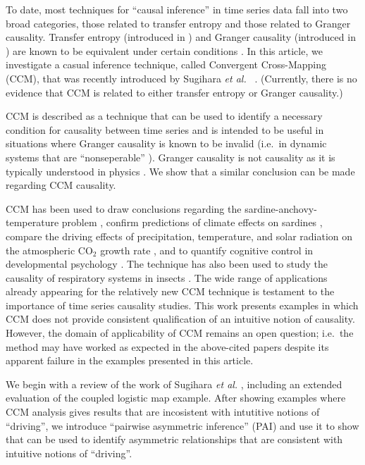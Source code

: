 \documentclass[twocolumn,aps,pre,groupedaddress]{revtex4-1}
\begin{document}
To date, most techniques for ``causal inference'' in time series data fall into two broad categories, those related to transfer entropy and those related to Granger causality.  Transfer entropy (introduced in \cite{Schreiber2000}) and Granger causality (introduced in \cite{granger1969}) are known to be equivalent under certain conditions \cite{Barnett2009}.  In this article, we investigate a casual inference technique, called Convergent Cross-Mapping (CCM), that was recently introduced by Sugihara {\em et al.\ } \cite{Sugihara2012}.  (Currently, there is no evidence that CCM is related to either transfer entropy or Granger causality.)

CCM is described as a technique that can be used to identify a necessary condition for causality between time series and is intended to be useful in situations where Granger causality is known to be invalid (i.e.\ in dynamic systems that are ``nonseperable'' \cite{Sugihara2012}). Granger causality is not causality as it is typically understood in physics \cite{Granger1980,liu2012,Roberts1985}.  We show that a similar conclusion can be made regarding CCM causality. 

CCM has been used to draw conclusions regarding the sardine-anchovy-temperature problem \cite{Sugihara2012}, confirm predictions of climate effects on sardines \cite{Deyle2013}, compare the driving effects of precipitation, temperature, and solar radiation on the atmospheric CO$_2$ growth rate \cite{Wang2014}, and to quantify cognitive control in developmental psychology \cite{Anastas2013}.  The technique has also been used to study the causality of respiratory systems in insects \cite{Bozorgmagham2013}.  The wide range of applications already appearing for the relatively new CCM technique is testament to the importance of time series causality studies.  This work presents examples in which CCM does not provide consistent qualification of an intuitive notion of causality.  However, the domain of applicability of CCM remains an open question; i.e.\ the method may have worked as expected in the above-cited papers despite its apparent failure in the examples presented in this article. 

We begin with a review of the work of Sugihara {\em et al.} \cite{Sugihara2012}, including an extended evaluation of the coupled logistic map example.  After showing examples where CCM analysis gives results that are incosistent with intutitive notions of ``driving'', we introduce ``pairwise asymmetric inference'' (PAI) and use it to show that can be used to identify asymmetric relationships that are consistent with intuitive notions of ``driving''.
\end{document}

